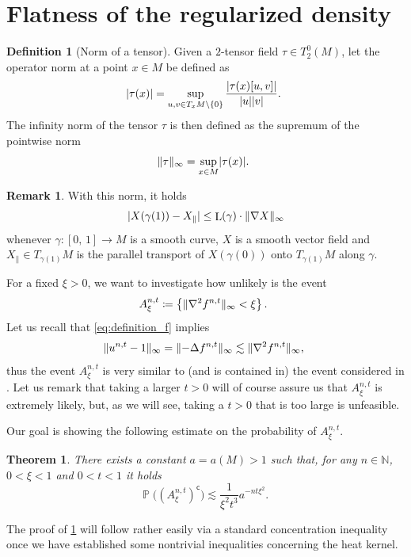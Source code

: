 \documentclass[10pt]{amsart}
\theoremstyle{plain}
\newtheorem{theorem}[theorem]{Theorem}
\theoremstyle{definition}
\newtheorem{remark}[remark]{Remark}
\newtheorem{definition}[definition]{Definition}
\numberwithin{equation}{section}
\newcommand{\NN}{\ensuremath{\mathbb N}}
\renewcommand{\complement}{\ensuremath{\mathsf{c}}}\newcommand{\de}{\ensuremath{\,\mathrm d}}
\newcommand{\defeq}{\ensuremath{\coloneqq}}
\newcommand{\lapl}{\ensuremath{\Delta}}
\newcommand{\bP}[1]{\ensuremath{\operatorname{\mathbb{P}}\bigl(#1\bigr)}}
\newcommand{\cc}[2]{\ensuremath{\left[#1,\,#2\right]}}
\renewcommand{\comma}{\ensuremath{\text{, }}}
\newcommand{\comma}{\ensuremath{\text{, }}}
\newcommand{\fullstop}{\ensuremath{\text{. }}}
\newcommand{\Xpar}{X_{\parallel}}
\DeclareMathOperator{\Length}{L}
\DeclarePairedDelimiter\abs{\lvert}{\rvert}
\DeclarePairedDelimiter\norm{\lVert}{\rVert}
\begin{document}
\section{Flatness of the regularized density}\label{sec:probability}
\begin{definition}[Norm of a tensor]\label{def:tensor_infinity_norm}
Given a $2$-tensor field $\tau\in T^0_2(M)$, let the operator norm at a point $x\in M$ be defined as
\begin{equation*}
\abs{\tau(x)} = \sup_{u,v\in T_xM\setminus\{0\}} \frac{\abs{\tau(x)[u,v]}}{\abs{u}\abs{v}} \fullstop
\end{equation*}
The infinity norm of the tensor $\tau$ is then defined as the supremum of the pointwise norm
\begin{equation*}
\norm{\tau}_\infty = \sup_{x\in M}\abs{\tau(x)}\fullstop
\end{equation*}
\end{definition}
\begin{remark}
With this norm, it holds
\begin{equation*}
\abs{X(\gamma(1))-\Xpar} \le \Length(\gamma)\cdot\norm{\nabla X}_\infty
\end{equation*}
whenever $\gamma:\cc01\to M$ is a smooth curve, $X$ is a smooth vector field and
$\Xpar\in T_{\gamma(1)}M$ is the parallel transport of $X(\gamma(0))$ onto $T_{\gamma(1)}M$
along $\gamma$.
\end{remark}

For a fixed $\xi>0$, we want to investigate how unlikely is the event
\begin{equation*}
A^{n,t}_\xi \defeq \left\{\norm{\nabla^2 f^{n,t}}_\infty < \xi\right\} \fullstop
\end{equation*}
Let us recall that \cref{eq:definition_f} implies
\begin{equation*}
\norm{u^{n,t}-1}_\infty = \norm{-\lapl f^{n,t}}_\infty\lesssim \norm{\nabla^2 f^{n,t}}_\infty \comma
\end{equation*}
thus the event $A^{n,t}_\xi$ is very similar to (and is contained in) the event considered
in \cite[Prop.\,3.10]{Ambrosio-Stra-Trevisan2018}.
Let us remark that taking a larger $t>0$ will of course assure us that $A^{n,t}_\xi$ is extremely likely, but,
as we will see, taking a $t>0$ that is too large is unfeasible.

Our goal is showing the following estimate on the probability of $A^{n,t}_\xi$.
\begin{theorem}\label{thm:prob_flat_density}
There exists a constant $a=a(M)>1$ such that, for any $n\in\NN$, $0<\xi<1$ and $0<t<1$ it holds
\begin{equation*}
\bP{(A^{n,t}_\xi)^{\complement}}\lesssim\frac1{\xi^2t^3}a^{-nt\xi^2} \fullstop
\end{equation*}
\end{theorem}
The proof of \cref{thm:prob_flat_density} will follow rather easily via a standard
concentration inequality once we have established some nontrivial inequalities
concerning the heat kernel.
\end{document}
